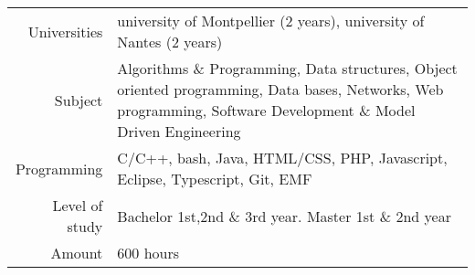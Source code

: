 \begin{tabular}{r @{~$\rangle$~} p{}}

Universities & university of Montpellier (2 years), university of Nantes (2 years) \\

Subject  & Algorithms \& Programming, Data structures, Object oriented programming, Data bases, Networks, Web programming, Software Development \& Model Driven Engineering \\

Programming & C/C++, bash, Java, HTML/CSS, PHP, Javascript, Eclipse, Typescript, Git, EMF\\

Level of study & Bachelor 1st,2nd \& 3rd year. Master 1st \& 2nd year \\
Amount & $600$ hours \\

\end{tabular}